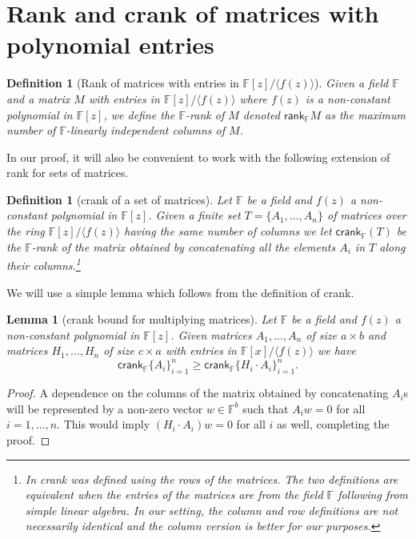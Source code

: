 \documentclass[11pt]{article}
\numberwithin{equation}{section}
\newtheorem{lem}[thm]{Lemma}
\newtheorem{define}[thm]{Definition}
\def\F{{\mathbb{F}}}
\def\rank{\textsf{rank}}
\def\crank{\textsf{crank}}
\begin{document}
\section{Rank and crank of matrices with polynomial entries}\label{sec:PreDD}

\begin{define}[Rank of matrices with entries in {$\mathbb{F}[z]/ \langle f(z)\rangle$}]
Given a field $\F$ and a matrix $M$ with entries in $\F[z]/\langle f(z)\rangle$ where $f(z)$ is a non-constant polynomial in $\F[z]$, we define the $\F$-rank of $M$ denoted {\em $\rank_\F M$}  as the maximum number of $\F$-linearly independent columns of $M$.
\end{define}


In our proof, it will also be convenient to work with the following extension of rank for sets of matrices.

\begin{define}[crank of a set of matrices]
Let $\F$ be a field and $f(z)$ a non-constant polynomial in $\F[z]$. Given a finite set $T=\{A_1,\hdots,A_n\}$ of matrices over the ring $\F[z]/\langle f(z)\rangle$ having the same number of columns we let {\em $\crank_\F(T)$} be the $\F$-rank of the matrix obtained by concatenating all the elements $A_i$ in $T$ along their columns.\footnote{
In \cite{dhar2021proof} crank was defined using the rows of the matrices. The two definitions are equivalent when the entries of the matrices are from the field $\F$ following from simple linear algebra. In our setting, the column and row definitions are not necessarily identical and the column version is better for our purposes.} 
\end{define}


We will use a simple lemma which follows from the definition of crank.

\begin{lem}[crank bound for multiplying matrices]\label{lem:crankMatMult}
Let $\F$ be a field and $f(z)$ a non-constant polynomial in $\F[z]$. Given matrices $A_1,\hdots,A_n$ of size $a\times b$ and matrices $H_1,\hdots, H_n$ of size $c\times a$ with entries in $\F[x]/\langle f(z)\rangle$ we have
\em{$$\crank_\F\{A_i\}_{i=1}^n\ge\crank_\F\{H_i \cdot A_i\}_{i=1}^n.$$}
\end{lem}
\begin{proof}
A dependence on the columns of the matrix obtained by concatenating $A_i$s will be represented by a non-zero vector $w\in \F^b$ such that $A_iw=0$ for all $i=1,\hdots,n$. This would imply $(H_i\cdot A_i)w=0$ for all $i$ as well, completing the proof.
\end{proof}
\end{document}
